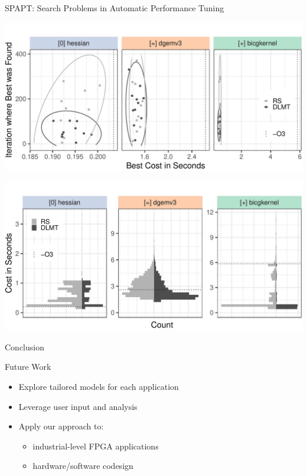 \documentclass[10pt, compress, aspectratio=169, xcolor={table,usenames,dvipsnames}]{beamer}
\begin{document}
\begin{frame}[label={sec:org4588540}]{SPAPT: Search Problems in Automatic Performance Tuning}
\begin{center}
\begin{center}
\includegraphics[width=.7\linewidth]{../../../img/iteration_best_comparison.pdf}
\end{center}
\end{center}

\begin{center}
\begin{center}
\includegraphics[width=.7\linewidth]{../../../img/split_histograms.pdf}
\end{center}
\end{center}
\end{frame}
\begin{frame}[label={sec:orgbf4f5af}]{Conclusion}
\begin{block}{Future Work}
\begin{itemize}
\item Explore \alert{tailored models} for each application
\item Leverage \alert{user input} and \alert{analysis}
\item Apply our approach to:
\begin{itemize}
\item \alert{industrial-level FPGA applications}
\item \alert{hardware/software codesign}
\end{itemize}
\end{itemize}
\end{block}
\end{frame}
\end{document}
